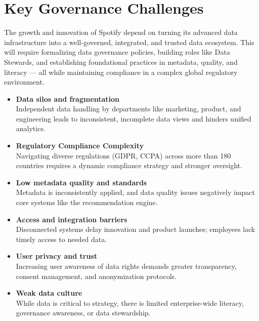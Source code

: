 \documentclass[11pt,a4paper,computermodern]{article}
\begin{document}
\section*{Key Governance Challenges}

The growth and innovation of Spotify depend on turning its advanced data infrastructure into a well-governed, integrated, and trusted data ecosystem. This will require formalizing data governance policies, building roles like Data Stewards, and establishing foundational practices in metadata, quality, and literacy — all while maintaining compliance in a complex global regulatory environment.

\begin{itemize}[itemsep=5pt, parsep=0pt]
	\item \textbf{Data silos and fragmentation}\\
	Independent data handling by departments like marketing, product, and engineering leads to inconsistent, incomplete data views and hinders unified analytics.
	\item \textbf{Regulatory Compliance Complexity}\\
	Navigating diverse regulations (GDPR, CCPA) across more than 180 countries requires a dynamic compliance strategy and stronger oversight.
	\item \textbf{Low metadata quality and standards}\\
	Metadata is inconsistently applied, and data quality issues negatively impact core systems like the recommendation engine.
	\item \textbf{Access and integration barriers}\\
	Disconnected systems delay innovation and product launches; employees lack timely access to needed data.
	\item \textbf{User privacy and trust}\\
	Increasing user awareness of data rights demands greater transparency, consent management, and anonymization protocols.
	\item \textbf{Weak data culture}\\
	While data is critical to strategy, there is limited enterprise-wide literacy, governance awareness, or data stewardship.
\end{itemize}
\end{document}

